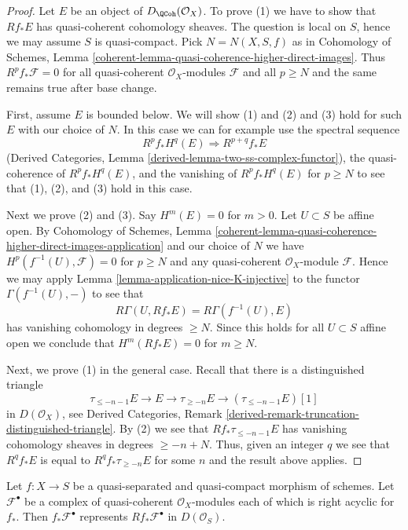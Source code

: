 \begin{proof}
Let $E$ be an object of $D_\QCoh(\mathcal{O}_X)$. To prove (1) we have to
show that $Rf_*E$ has quasi-coherent cohomology sheaves. The question is local
on $S$, hence we may assume $S$ is quasi-compact. Pick $N = N(X, S, f)$ as in
Cohomology of Schemes, Lemma
\ref{coherent-lemma-quasi-coherence-higher-direct-images}.
Thus $R^pf_*\mathcal{F} = 0$ for all quasi-coherent $\mathcal{O}_X$-modules
$\mathcal{F}$ and all $p \geq N$ and the same remains true after base change.

\medskip\noindent
First, assume $E$ is bounded below. We will show (1) and (2) and (3) hold
for such $E$ with our choice of $N$. In this case we can for example use the
spectral sequence
$$
R^pf_*H^q(E) \Rightarrow R^{p + q}f_*E
$$
(Derived Categories, Lemma \ref{derived-lemma-two-ss-complex-functor}),
the quasi-coherence of $R^pf_*H^q(E)$, and the vanishing of $R^pf_*H^q(E)$
for $p \geq N$ to see that (1), (2), and (3) hold in this case.

\medskip\noindent
Next we prove (2) and (3). Say $H^m(E) = 0$ for $m > 0$.
Let $U \subset S$ be affine open. By Cohomology of Schemes, Lemma
\ref{coherent-lemma-quasi-coherence-higher-direct-images-application}
and our choice of $N$
we have $H^p(f^{-1}(U), \mathcal{F}) = 0$ for $p \geq N$
and any quasi-coherent $\mathcal{O}_X$-module $\mathcal{F}$.
Hence we may apply Lemma \ref{lemma-application-nice-K-injective}
to the functor $\Gamma(f^{-1}(U), -)$ to see that
$$
R\Gamma(U, Rf_*E) = R\Gamma(f^{-1}(U), E)
$$
has vanishing cohomology in degrees $\geq N$. Since this holds for
all $U \subset S$ affine open we conclude that $H^m(Rf_*E) = 0$
for $m \geq N$.

\medskip\noindent
Next, we prove (1) in the general case. Recall that there is a
distinguished triangle
$$
\tau_{\leq -n - 1}E \to E \to \tau_{\geq -n}E \to
(\tau_{\leq -n - 1}E)[1]
$$
in $D(\mathcal{O}_X)$, see Derived Categories, Remark
\ref{derived-remark-truncation-distinguished-triangle}.
By (2) we see that $Rf_*\tau_{\leq -n - 1}E$
has vanishing cohomology sheaves in degrees $\geq -n + N$.
Thus, given an integer $q$ we see that $R^qf_*E$ is equal
to $R^qf_*\tau_{\geq -n}E$ for some $n$ and the result
above applies.
\end{proof}

\begin{lemma}
\label{lemma-acyclicity-lemma}
Let $f : X \to S$ be a quasi-separated and quasi-compact morphism
of schemes. Let $\mathcal{F}^\bullet$ be a complex of quasi-coherent
$\mathcal{O}_X$-modules each of which is right acyclic for $f_*$.
Then $f_*\mathcal{F}^\bullet$ represents $Rf_*\mathcal{F}^\bullet$
in $D(\mathcal{O}_S)$.
\end{lemma}

